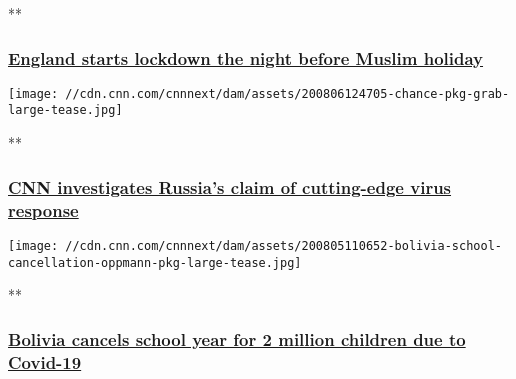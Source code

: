 **

\hypertarget{england-starts-lockdown-the-night-before-muslim-holiday-1}{%
\subsubsection{\texorpdfstring{\href{/videos/world/2020/08/06/england-lockdown-on-eid-eve-muslims-veselinovic-vpx.cnn/video/playlists/coronavirus-intl/}{England
starts lockdown the night before Muslim
holiday}}{England starts lockdown the night before Muslim holiday}}\label{england-starts-lockdown-the-night-before-muslim-holiday-1}}

\href{/videos/world/2020/08/06/russia-vaccine-testing-matthew-chance-pkg-newday-intl-ldn-vpx.cnn/video/playlists/coronavirus-intl/}{}

\texttt{[image: //cdn.cnn.com/cnnnext/dam/assets/200806124705-chance-pkg-grab-large-tease.jpg]}

**

\hypertarget{cnn-investigates-russias-claim-of-cutting-edge-virus-response}{%
\subsubsection{\texorpdfstring{\href{/videos/world/2020/08/06/russia-vaccine-testing-matthew-chance-pkg-newday-intl-ldn-vpx.cnn/video/playlists/coronavirus-intl/}{CNN
investigates Russia's claim of cutting-edge virus
response}}{CNN investigates Russia's claim of cutting-edge virus response}}\label{cnn-investigates-russias-claim-of-cutting-edge-virus-response}}

\href{/videos/world/2020/08/05/bolivia-schools-closed-coronavirus-covid-19-pandemic-cases-latin-america-oppmann-pkg-intl-ldn-vpx.cnn/video/playlists/coronavirus-intl/}{}

\texttt{[image: //cdn.cnn.com/cnnnext/dam/assets/200805110652-bolivia-school-cancellation-oppmann-pkg-large-tease.jpg]}

**

\hypertarget{bolivia-cancels-school-year-for-2-million-children-due-to-covid-19}{%
\subsubsection{\texorpdfstring{\href{/videos/world/2020/08/05/bolivia-schools-closed-coronavirus-covid-19-pandemic-cases-latin-america-oppmann-pkg-intl-ldn-vpx.cnn/video/playlists/coronavirus-intl/}{Bolivia
cancels school year for 2 million children due to
Covid-19}}{Bolivia cancels school year for 2 million children due to Covid-19}}\label{bolivia-cancels-school-year-for-2-million-children-due-to-covid-19}}

